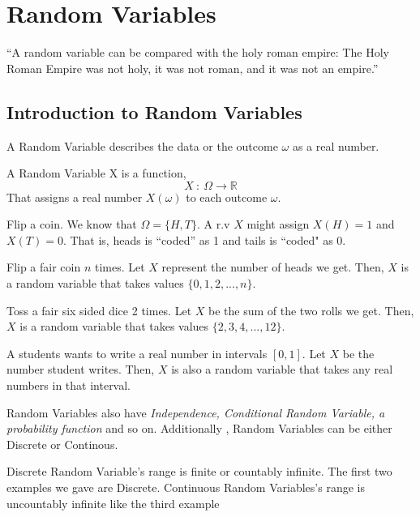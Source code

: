 \chapter{Random Variables}
``A random variable can be compared with the holy roman empire: The Holy Roman Empire was not holy, it was not roman, and it was not an
empire.'' \\


\section{Introduction to Random Variables}

A Random Variable describes the data or the outcome $\omega$ as a real number.

\begin{definition}
    A \alert{Random Variable X} is a function,
    $$ X \ : \ \Omega \rightarrow \mathbb{R}$$
    That assigns a real number $X(\omega)$ to each outcome $\omega$. \\
\end{definition}

\begin{example} Flip a coin. We know that $\Omega =\{H,T\}$. A r.v $X$ might assign $X(H) = 1$ and $X(T) = 0$. That is, heads is ``coded''
    as 1 and tails is ``coded" as 0.

\end{example}
\begin{example}
    Flip a fair coin $n$ times. Let $X$ represent the number of heads we get. Then, $X$ is a random variable that takes values $\{0,1,2,...,n\}$.
\end{example}

\begin{example}
    Toss a fair six sided dice 2 times. Let $X$ be the sum of the two rolls we get. Then, $X$ is a random variable that takes values
    $\{2,3,4,...,12\}$.
\end{example}

\begin{example}
    A students wants to write a real number in intervals $[0,1]$. Let $X$ be the number student writes. Then, $X$ is also a random variable
    that takes any real numbers in that interval.
\end{example}

Random Variables also have \textit{Independence, Conditional Random Variable, a
probability function} and so on. Additionally , Random Variables can be either \alert{Discrete} or \alert{Continous}.
\par
Discrete Random Variable's range is finite or countably infinite. The first two examples we gave are Discrete. Continuous Random
Variables's range is uncountably infinite like the third example \newline

